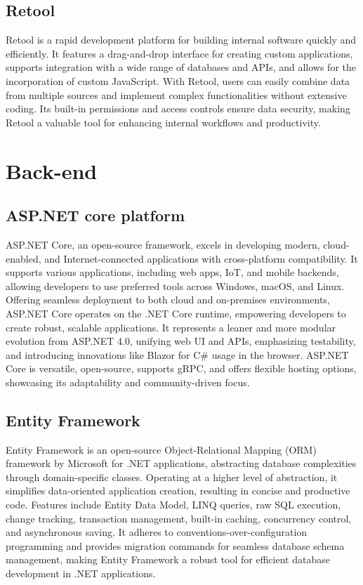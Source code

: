 \subsection{Retool}
Retool is a rapid development platform for building internal software quickly and efficiently. It features a drag-and-drop interface for creating custom applications, supports integration with a wide range of databases and APIs, and allows for the incorporation of custom JavaScript. With Retool, users can easily combine data from multiple sources and implement complex functionalities without extensive coding. Its built-in permissions and access controls ensure data security, making Retool a valuable tool for enhancing internal workflows and productivity.

\section{Back-end}

\subsection{ASP.NET core platform}

ASP.NET Core, an open-source framework, excels in developing modern,
cloud-enabled, and Internet-connected applications with cross-platform
compatibility. It supports various applications, including web apps,
IoT, and mobile backends, allowing developers to use preferred tools
across Windows, macOS, and Linux. Offering seamless deployment to both
cloud and on-premises environments, ASP.NET Core operates on the .NET
Core runtime, empowering developers to create robust, scalable
applications. It represents a leaner and more modular evolution from
ASP.NET 4.0, unifying web UI and APIs, emphasizing testability, and
introducing innovations like Blazor for C\# usage in the browser.
ASP.NET Core is versatile, open-source, supports gRPC, and offers
flexible hosting options, showcasing its adaptability and
community-driven focus.

\subsection{Entity Framework}

Entity Framework is an open-source Object-Relational Mapping (ORM)
framework by Microsoft for .NET applications, abstracting database
complexities through domain-specific classes. Operating at a higher
level of abstraction, it simplifies data-oriented application creation,
resulting in concise and productive code. Features include Entity Data
Model, LINQ queries, raw SQL execution, change tracking, transaction
management, built-in caching, concurrency control, and asynchronous
saving. It adheres to conventions-over-configuration programming and
provides migration commands for seamless database schema management,
making Entity Framework a robust tool for efficient database development
in .NET applications.


